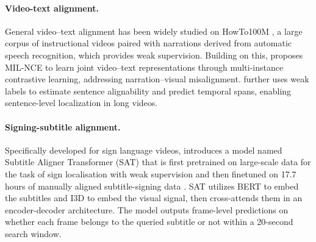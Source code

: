 \documentclass[11pt]{article}
\begin{document}



\paragraph{Video-text alignment.} 

General video–text alignment has been widely studied on HowTo100M \citep{miech19howto100m}, a large corpus of instructional videos paired with narrations derived from automatic speech recognition, which provides weak supervision. 
Building on this, \citet{miech20endtoend} proposes MIL-NCE to learn joint video–text representations through multi-instance contrastive learning, addressing narration–visual misalignment. 
\citet{han2022temporal} further uses weak labels to estimate sentence alignability and predict temporal spans, enabling sentence-level localization in long videos.

\paragraph{Signing-subtitle alignment.}

Specifically developed for sign language videos, \citet{bull2021aligning} introduces a model named Subtitle Aligner Transformer (SAT) that is first pretrained on large-scale data for the task of sign localisation with weak supervision and then finetuned on 17.7 hours of manually aligned subtitle-signing data \cite{albanie2020bsl}. 
SAT utilizes BERT \cite{devlin-etal-2019-bert} to embed the subtitles and I3D \cite{carreira2017quo} to embed the visual signal, then cross-attends them in an encoder-decoder architecture. 
The model outputs frame-level predictions on whether each frame belongs to the queried subtitle or not within a 20-second search window. 
\end{document}

